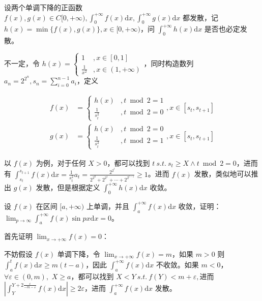\begin{ques}
	设两个单调下降的正函数 $\displaystyle f( x) ,g( x) \in C[ 0,+\infty ) ,\int _{0}^{+\infty } f( x)\mathrm{d} x,\int _{0}^{+\infty } g( x)\mathrm{d} x$ 都发散，记 $\displaystyle h( x) =\min\{f( x) ,g( x)\} ,x\in [ 0,+\infty )$，问 $\displaystyle \int _{0}^{+\infty } h( x)\mathrm{d} x$ 是否也必定发散。
\end{ques}



不一定，令 $\displaystyle h( x) =\begin{cases}
	1 & ,x\in [ 0,1]\\
	\frac{1}{x^{2}} & ,x\in ( 1,+\infty )
\end{cases}$，同时构造数列 $\displaystyle a_{n} =2^{2^{n}} ,s_{n} =\sum _{i=0}^{n-1} a_{i}$，定义


\begin{align*}
	f( x) & =\begin{cases}
		h( x) & ,t\bmod 2=1\\
		\frac{1}{s_{t}^{2}} & ,t\bmod 2=0
	\end{cases} ,x\in [ s_{t} ,s_{t+1}]\\
	g( x) & =\begin{cases}
		h( x) & ,t\bmod 2=0\\
		\frac{1}{s_{t}^{2}} & ,t\bmod 2=1
	\end{cases} ,x\in [ s_{t} ,s_{t+1}]
\end{align*}


以 $\displaystyle f( x)$ 为例，对于任何 $\displaystyle X >0$，都可以找到 $\displaystyle t\ s.t.\ s_{t} \geqslant X\land t\bmod 2=0$，进而有 $\displaystyle \int _{s_{t}}^{s_{t+1}} f( x)\mathrm{d} x=\frac{1}{s_{t}^{2}} a_{t} =\frac{2^{2^{t}}}{2^{2^{0}} +2^{2^{1}} +\cdots +2^{2^{t-1}}} \geqslant 1$。进而 $\displaystyle f( x)$ 发散，类似地可以推出 $\displaystyle g( x)$ 发散，但是根据定义 $\displaystyle \int _{0}^{+\infty } h( x)\mathrm{d} x$ 收敛。



\begin{ques}
	设 $\displaystyle f( x)$ 在区间 $\displaystyle [ a,+\infty )$ 上单调，并且 $\displaystyle \int _{a}^{+\infty } f( x)\mathrm{d} x$ 收敛，证明：$\displaystyle \lim _{p\rightarrow \infty }\int _{a}^{+\infty } f( x)\sin px\mathrm{d} x=0$。
\end{ques}



首先证明 $\displaystyle \lim _{x\rightarrow +\infty } f( x) =0$：

不妨假设 $\displaystyle f( x)$ 单调下降，令 $\displaystyle \lim _{x\rightarrow +\infty } f( x) =m$，如果 $\displaystyle m >0$ 则 $\displaystyle \int _{a}^{t} f( x)\mathrm{d} x\geqslant m( t-a)$，因此 $\displaystyle \int _{a}^{+\infty } f( x)\mathrm{d} x$ 不收敛。如果 $\displaystyle m< 0$，$\displaystyle \forall \varepsilon \in ( 0,m) ,$ $\displaystyle X\geqslant a$，都可以找到 $\displaystyle X< Y\ s.t.\ f( Y) < m+\varepsilon ,$进而 $\displaystyle \left| \int _{Y}^{Y+2\frac{\varepsilon }{-m-\varepsilon }} f( x)\mathrm{d} x\right| \geqslant 2\varepsilon $，进而 $\displaystyle \int _{a}^{+\infty } f( x)\mathrm{d} x$ 发散。


